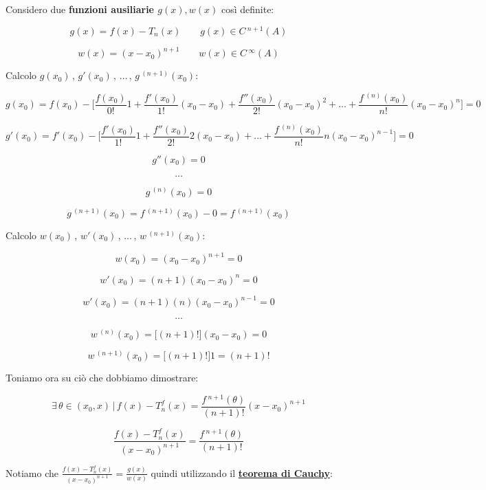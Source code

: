 \documentclass[../dimostrazioni]{subfiles}
\begin{document}
            \medskip

            Considero due \textbf{funzioni ausiliarie \(g(x), w(x)\)} così definite:

            \[  g(x) = f(x) - T_n (x) \qquad g(x) \in C\,^{n+1} (A)  \]

            \[  w(x) = (x - x_0)^{n+1} \qquad w(x) \in C\,^{\infty} (A)  \]

            Calcolo \( g(x_0)\, , \, g'(x_0)\, ,\, \dots\, , \, g \,^{(n+1)}(x_0)  \):
            
            \[  g(x_0) = f(x_0) - \bigg[\frac{f(x_0)}{0!}1 + \frac{f'(x_0)}{1!}(x_0-x_0) + \frac{f''(x_0)}{2!}(x_0-x_0)^2 + \dots + \frac{f\,^{(n)}(x_0)}{n!}(x_0-x_0)^n \bigg] = 0\]

            \[  g'(x_0) = f'(x_0) - \bigg[\frac{f'(x_0)}{1!}1 + \frac{f''(x_0)}{2!}2(x_0-x_0) + \dots + \frac{f\,^{(n)}(x_0)}{n!}n(x_0-x_0)^{n-1} \bigg] = 0 \]
    
            \[  g''(x_0) = 0    \]
            
            \[  \dots \]

            \[  g\,^{(n)} (x_0) = 0   \]

            \[  g\,^{(n+1)} (x_0) = f\,^{(n+1)}(x_0) - 0 = f\,^{(n+1)}(x_0)   \]

            Calcolo \( w(x_0)\, , \, w'(x_0)\, ,\, \dots\, , \, w \,^{(n+1)}(x_0)  \):

            \[  w(x_0) = (x_0 - x_0)^{n+1} = 0  \]

            \[  w'(x_0) = (n+1)(x_0 - x_0)^{n} = 0  \]

            \[  w'(x_0) = (n+1)(n)(x_0 - x_0)^{n-1} = 0  \]

            \[  \dots \]

            \[  w\,^{(n)} (x_0) = \big[(n+1)!\big](x_0 - x_0) = 0   \]

            \[  w\,^{(n+1)} (x_0) = \big[(n+1)!\big] 1 = (n+1)!   \]

            Toniamo ora su ciò che dobbiamo dimostrare:

            \[  \exists \, \theta \in (x_0, x) \, | \, f(x) - T _n ^ f (x) = \frac{f\,^{n+1}(\theta)}{(n+1)!}(x-x_0)^{n+1} \]

            \[  \frac{f(x) - T _n ^ f (x)}{(x-x_0)^{n+1}} = \frac{f\,^{n+1}(\theta)}{(n+1)!}    \]

            Notiamo che \(  \frac{f(x) - T _n ^ f (x)}{(x-x_0)^{n+1}} = \frac{g(x)}{w(x)}    \) quindi utilizzando il \textbf{\hyperref[teoCauchy]{teorema di Cauchy}}:
\end{document}
